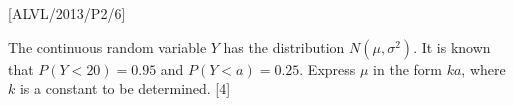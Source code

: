 \item {[}ALVL/2013/P2/6{]} 

The continuous random variable $Y$ has the distribution $N\left(\mu,\sigma^{2}\right)$.
It is known that $P\left(Y<20\right)=0.95$ and $P\left(Y<a\right)=0.25$.
Express $\mu$ in the form $ka$, where $k$ is a constant to be determined.
\hfill{}{[}4{]}
